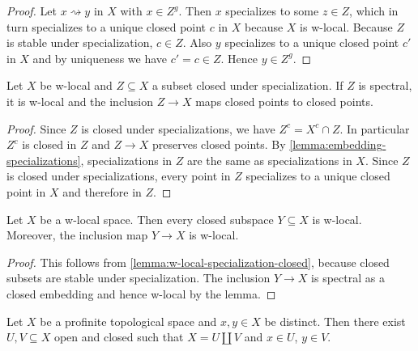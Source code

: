 \begin{proof}
    Let $x \rightsquigarrow y$ in $X$ with $x \in Z^g$. Then $x$ specializes to some $z \in Z$, which
    in turn specializes to a unique closed point $c$ in $X$ because $X$ is w-local.
    Because $Z$ is stable under specialization, $c \in Z$. Also $y$ specializes to a unique closed
    point $c'$ in $X$ and by uniqueness we have $c' = c \in Z$. Hence $y \in Z^g$.
\end{proof}

\begin{lemma}
    Let $X$ be w-local and $Z \subseteq X$ a subset closed under specialization. If
    $Z$ is spectral, it is w-local and the inclusion $Z \to X$ maps closed points to closed points.
    \label{lemma:w-local-specialization-closed}
\end{lemma}

\begin{proof}
    Since $Z$ is closed under specializations, we have $Z^c = X^c \cap Z$. In particular
    $Z^c$ is closed in $Z$ and $Z \to X$ preserves closed points.
    By \ref{lemma:embedding-specializations}, specializations
    in $Z$ are the same as specializations in $X$. Since $Z$ is closed
    under specializations, every point in $Z$ specializes to a unique
    closed point in $X$ and therefore in $Z$.
\end{proof}

\begin{lemma}
  \label{thm:closed-subspace-w-local}
  Let \(X\) be a w-local space. Then every closed subspace \(Y \subseteq X\) is w-local.
  Moreover, the inclusion map \(Y \to X\) is w-local.
\end{lemma}

\begin{proof}
    This follows from \ref{lemma:w-local-specialization-closed}, because
    closed subsets are stable under specialization. The inclusion $Y \to X$ is
    spectral as a closed embedding and hence w-local by the lemma.
\end{proof}

\begin{lemma}
    Let $X$ be a profinite topological space and $x, y \in X$ be distinct. Then
    there exist $U, V \subseteq X$ open and closed such that $X = U \coprod V$ and
    $x \in U$, $y \in V$.
    \label{lemma:profinite-disj-clopen-separation}
\end{lemma}

